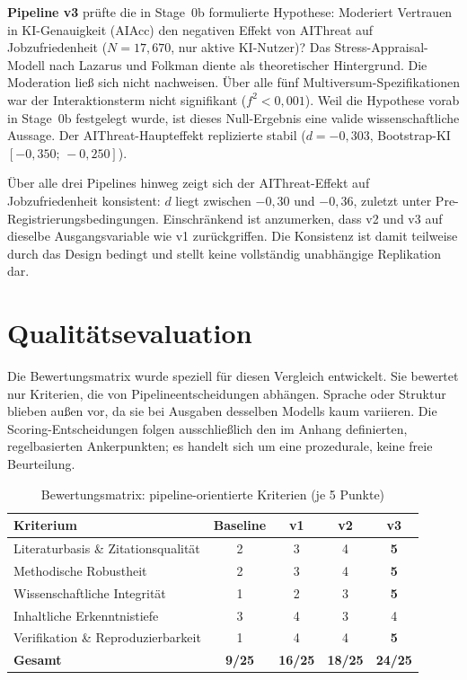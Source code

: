 \documentclass[11pt,a4paper]{article}
\begin{document}
\textbf{Pipeline v3} prüfte die in Stage~0b formulierte Hypothese: Moderiert
Vertrauen in KI-Genauigkeit (AIAcc) den negativen Effekt von AIThreat auf
Jobzufriedenheit ($N = 17{,}670$, nur aktive KI-Nutzer)? Das
Stress-Appraisal-Modell nach Lazarus und Folkman \cite{lazarus1984} diente als
theoretischer Hintergrund. Die Moderation ließ sich nicht nachweisen. Über alle
fünf Multiversum-Spezifikationen war der Interaktionsterm nicht signifikant
($f^2 < 0{,}001$). Weil die Hypothese vorab in Stage~0b festgelegt wurde, ist
dieses Null-Ergebnis eine valide wissenschaftliche Aussage.
Der AIThreat-Haupteffekt replizierte stabil ($d = -0{,}303$,
Bootstrap-KI $[-0{,}350;\, -0{,}250]$).

Über alle drei Pipelines hinweg zeigt sich der AIThreat-Effekt auf Jobzufriedenheit
konsistent: $d$ liegt zwischen $-0{,}30$ und $-0{,}36$, zuletzt unter
Pre-Registrierungsbedingungen. Einschränkend ist anzumerken, dass v2 und v3 auf dieselbe Ausgangsvariable wie
v1 zurückgriffen. Die Konsistenz ist damit teilweise durch das Design bedingt und stellt keine
vollständig unabhängige Replikation dar.

\section{Qualit\"atsevaluation}

Die Bewertungsmatrix wurde speziell für diesen Vergleich entwickelt. Sie bewertet
nur Kriterien, die von Pipelineentscheidungen abhängen. Sprache oder Struktur
blieben außen vor, da sie bei Ausgaben desselben Modells kaum variieren. Die
Scoring-Entscheidungen folgen ausschließlich den im Anhang definierten, regelbasierten
Ankerpunkten; es handelt sich um eine prozedurale, keine freie Beurteilung.
\clearpage
\begin{table}[h]
\centering
\caption{Bewertungsmatrix: pipeline-orientierte Kriterien (je 5 Punkte)}
\label{tab:matrix}
\small
\begin{tabular}{lcccc}
\toprule
\textbf{Kriterium} & \textbf{Baseline} & \textbf{v1} & \textbf{v2} & \textbf{v3} \\
\midrule
Literaturbasis \& Zitationsqualität & 2 & 3 & 4 & \textbf{5} \\
Methodische Robustheit & 2 & 3 & 4 & \textbf{5} \\
Wissenschaftliche Integrität & 1 & 2 & 3 & \textbf{5} \\
Inhaltliche Erkenntnistiefe & 3 & 4 & 3 & 4 \\
Verifikation \& Reproduzierbarkeit & 1 & 4 & 4 & \textbf{5} \\
\midrule
\textbf{Gesamt} & \textbf{9/25} & \textbf{16/25} & \textbf{18/25} & \textbf{24/25} \\
\bottomrule
\end{tabular}
\end{table}
\end{document}
